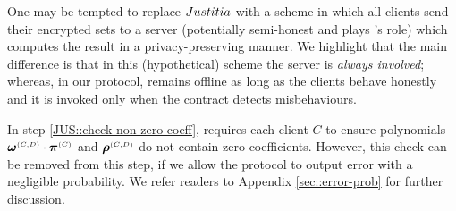 \begin{enumerate}
 
 
 
 
  \end{enumerate}
 
 
 
 
 
 

One may be tempted to replace ${Justitia}$ with a scheme in which all clients send their encrypted sets to a server (potentially semi-honest and plays \aud's role) which computes the result in a privacy-preserving manner.  We highlight that the main difference is that in this (hypothetical) scheme the server is \emph{always involved};  whereas, in our protocol, \aud remains offline as long as the clients behave honestly and it is invoked only when the contract detects misbehaviours.  

In step \ref{JUS::check-non-zero-coeff}, \fpsi requires each client $C$ to ensure polynomials $\bm\omega^{\scriptscriptstyle (C,D)}\cdot \bm\pi^{\scriptscriptstyle  {  {(C)}}}$ and  $\bm\rho^{\scriptscriptstyle (C,D)}$ do not contain zero coefficients. However,  this check can be removed from this step, if we allow the protocol to output error with a negligible probability. We refer readers to Appendix \ref{sec::error-prob} for further discussion. 

